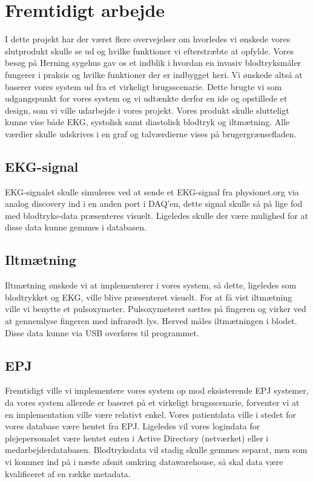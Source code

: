 \section{Fremtidigt arbejde}
I dette projekt har der været flere overvejelser om hvorledes vi ønskede vores slutprodukt skulle se ud og hvilke funktioner vi efterstræbte at opfylde. Vores besøg på Herning sygehus gav os et indblik i hvordan en invasiv blodtryksmåler fungerer i praksis og hvilke funktioner der er indbygget heri. Vi ønskede altså at baserer vores system ud fra et virkeligt brugsscenarie. Dette brugte vi som udgangspunkt for vores system og vi udtænkte derfor en ide og opstillede et design, som vi ville udarbejde i vores projekt. Vores produkt skulle slutteligt kunne vise både EKG, systolisk samt diastolisk blodtryk og iltmætning. Alle værdier skulle udskrives i en graf og talværdierne vises på brugergrænsefladen. 
\subsection{EKG-signal}
EKG-signalet skulle  simuleres ved at sende et EKG-signal fra physionet.org via analog discovery ind i en anden port i DAQ’en, dette signal skulle så på lige fod med blodtryks-data præsenteres visuelt. Ligeledes skulle der være mulighed for at disse data kunne gemmes i databasen.
\subsection{Iltmætning}
Iltmætning ønskede vi at implementerer i vores system, så dette, ligeledes som blodtrykket og EKG, ville blive præsenteret visuelt. For at få vist iltmætning ville vi benytte et pulsoxymeter. Pulsoxymeteret sættes på fingeren og virker ved at gennemlyse fingeren med infrarødt lys. Herved måles iltmætningen i blodet. Disse data kunne via USB overføres til programmet. 
\subsection{EPJ}
Fremtidigt ville vi implementere vores system op mod eksisterende EPJ systemer, da vores system allerede er baseret på et virkeligt brugsscenarie, forventer vi at en implementation ville være relativt enkel. Vores patientdata ville i stedet for vores database være hentet fra EPJ.  Ligeledes vil vores logindata for plejepersonalet være hentet enten i Active Directory (netværket) eller i medarbejderdatabasen. Blodtryksdata vil stadig skulle gemmes separat, men som vi kommer ind på i næste afsnit omkring datawarehouse, så skal data være kvalificeret af en række metadata.
